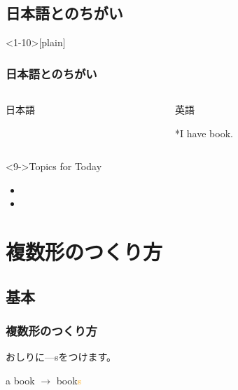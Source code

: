 \documentclass[aspectratio=169]{beamer}
\begin{document}
\subsection{日本語とのちがい}
\begin{frame}<1-10>[plain]\frametitle{日本語とのちがい}
\begin{columns}
\begin{column}[t]{.45\textwidth}
\begin{block}{日本語}


\end{block}
\end{column}
\begin{column}[t]{.45\textwidth}
\begin{block}{英語}


*{I have \textcolor{red!50}{book}.}
\end{block}
\end{column}
\end{columns}

\begin{exampleblock}<9->{Topics for Today}
\begin{itemize}
 \item<1->  
 \item<2->  
\end{itemize}
      \end{exampleblock}

\end{frame}

\section{複数形のつくり方}
\subsection{基本}
\begin{frame}[plain]\frametitle{複数形のつくり方}
 
\Large
おしりに---sをつけます。

a book $\longrightarrow$ book\textcolor{orange}{s}

\end{frame}
\end{document}
